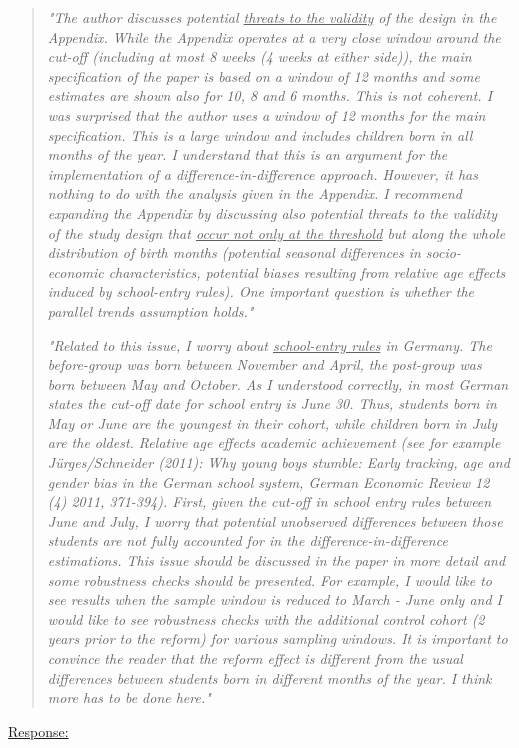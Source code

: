\begin{quote}
	\textit{"The author discusses potential \underline{threats to the validity} of the design in the Appendix. While the Appendix operates at a very close window around the cut-off (including at most 8 weeks (4 weeks at either side)), the main specification of the paper is based on a window of 12 months and some estimates are shown also for 10, 8 and 6 months. This is not coherent. I was surprised that the author uses a window of 12 months for the main specification. This is a large window and includes children born in all months of the year. I understand that this is an argument for the implementation of a difference-in-difference approach. However, it has nothing to do with the analysis given in the Appendix. I recommend expanding the Appendix by discussing also potential threats to the validity of the study design that \underline{occur not only at the threshold} but along the whole distribution of birth months (potential seasonal differences in socio-economic characteristics, potential biases resulting from relative age effects induced by school-entry rules). One important question is whether the parallel trends assumption holds."}
	
	\textit{"Related to this issue, I worry about \underline{school-entry rules} in Germany. The before-group was born between November and April, the post-group was born between May and October. As I understood correctly, in most German states the cut-off date for school entry is June 30. Thus, students born in May or June are the youngest in their cohort, while children born in July are the oldest. Relative age effects academic achievement (see for example Jürges/Schneider (2011): Why young boys stumble: Early tracking, age and gender bias in the German school system, German Economic Review 12 (4) 2011, 371-394). First, given the cut-off in school entry rules between June and July, I worry that potential unobserved differences between those students are not fully accounted for in the difference-in-difference estimations. This issue should be discussed in the paper in more detail and some robustness checks should be presented. For example, I would like to see results when the sample window is reduced to March - June only and I would like to see robustness checks with the additional control cohort (2 years prior to the reform) for various sampling windows. It is important to convince the reader that the reform effect is different from the usual differences between students born in different months of the year. I think more has to be done here."}
\end{quote}
\underline{Response:}

